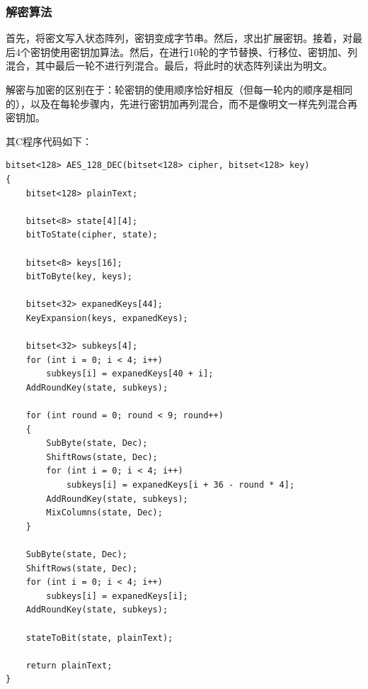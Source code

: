 \subsubsection{解密算法}
首先，将密文写入状态阵列，密钥变成字节串。然后，求出扩展密钥。接着，对最后4个密钥使用密钥加算法。然后，在进行10轮的字节替换、行移位、密钥加、列混合，其中最后一轮不进行列混合。最后，将此时的状态阵列读出为明文。\par
解密与加密的区别在于：轮密钥的使用顺序恰好相反（但每一轮内的顺序是相同的），以及在每轮步骤内，先进行密钥加再列混合，而不是像明文一样先列混合再密钥加。\par
其C程序代码如下：
\begin{prove}
\begin{verbatim}
bitset<128> AES_128_DEC(bitset<128> cipher, bitset<128> key)
{
    bitset<128> plainText;
    
    bitset<8> state[4][4];
    bitToState(cipher, state);
    
    bitset<8> keys[16];
    bitToByte(key, keys);
    
    bitset<32> expanedKeys[44];
    KeyExpansion(keys, expanedKeys);
    
    bitset<32> subkeys[4];
    for (int i = 0; i < 4; i++)
        subkeys[i] = expanedKeys[40 + i];
    AddRoundKey(state, subkeys);
    
    for (int round = 0; round < 9; round++)
    {
        SubByte(state, Dec);
        ShiftRows(state, Dec);
        for (int i = 0; i < 4; i++)
            subkeys[i] = expanedKeys[i + 36 - round * 4];
        AddRoundKey(state, subkeys);
        MixColumns(state, Dec);
    }
    
    SubByte(state, Dec);
    ShiftRows(state, Dec);
    for (int i = 0; i < 4; i++)
        subkeys[i] = expanedKeys[i];
    AddRoundKey(state, subkeys);
    
    stateToBit(state, plainText);

    return plainText;
}
\end{verbatim}
\end{prove}